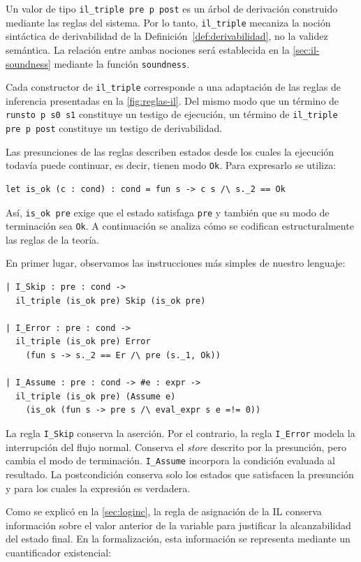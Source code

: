 \documentclass[a4paper,	11pt]{report}
\newif\ifdraft\drafttrue
\newcommand{\comm}[3]{\ifdraft{{\color{#1}[#2: #3]}}\fi}
\newcommand{\guido}[1]{\comm{blue}{Guido}{#1}}
\begin{document}
Un valor de tipo \lstinline|il_triple pre p post| es un árbol de derivación construido mediante las reglas del sistema.
Por lo tanto,
\lstinline|il_triple| mecaniza la noción sintáctica de derivabilidad de la Definición~\ref{def:derivabilidad},
no la validez semántica.
La relación entre ambas nociones será establecida en la \autoref{sec:il-soundness} mediante la función \lstinline|soundness|.

Cada constructor de \lstinline|il_triple| corresponde a una adaptación de las reglas de inferencia presentadas en la \autoref{fig:reglas-il}.
Del mismo modo que un término de \lstinline|runsto p s0 s1| constituye un testigo de ejecución,
un término de \lstinline|il_triple pre p post| constituye un testigo de derivabilidad.

Las presunciones de las reglas describen estados desde los cuales la ejecución todavía puede continuar,
es decir, tienen modo \lstinline|Ok|.
Para expresarlo se utiliza:

\begin{lstlisting}
let is_ok (c : cond) : cond = fun s -> c s /\ s._2 == Ok
\end{lstlisting}

Así, \lstinline|is_ok pre| exige que el estado satisfaga \lstinline|pre| y también que su modo de terminación sea \lstinline|Ok|.
A continuación se analiza cómo se codifican estructuralmente las reglas de la teoría.

En primer lugar, observamos las instrucciones más simples de nuestro lenguaje:

\begin{lstlisting}
| I_Skip : pre : cond ->
  il_triple (is_ok pre) Skip (is_ok pre)

| I_Error : pre : cond ->
  il_triple (is_ok pre) Error
    (fun s -> s._2 == Er /\ pre (s._1, Ok))

| I_Assume : pre : cond -> #e : expr ->
  il_triple (is_ok pre) (Assume e)
    (is_ok (fun s -> pre s /\ eval_expr s e =!= 0))
\end{lstlisting}
La regla \lstinline|I_Skip| conserva la aserción.
Por el contrario,
la regla \lstinline|I_Error| modela la interrupción del flujo normal.
Conserva el \emph{store} descrito por la presunción,
pero cambia el modo de terminación.
\lstinline|I_Assume| incorpora la condición evaluada al resultado.
La postcondición conserva solo los estados que satisfacen la presunción y para los cuales la expresión es verdadera.

Como se explicó en la \autoref{sec:loginc},
la regla de asignación de la IL conserva información sobre el valor anterior de la variable para justificar la alcanzabilidad del estado final.
En la formalización,
esta información se representa mediante un cuantificador existencial:
\end{document}
